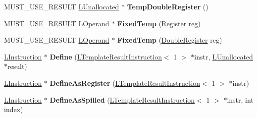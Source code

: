 \begin{DoxyCompactItemize}
\item 
M\+U\+S\+T\+\_\+\+U\+S\+E\+\_\+\+R\+E\+S\+U\+LT \hyperlink{classv8_1_1internal_1_1_l_unallocated}{L\+Unallocated} $\ast$ {\bfseries Temp\+Double\+Register} ()\hypertarget{classv8_1_1internal_1_1_l_chunk_builder_a34a748e14f232421985ee36f9491a782}{}\label{classv8_1_1internal_1_1_l_chunk_builder_a34a748e14f232421985ee36f9491a782}

\item 
M\+U\+S\+T\+\_\+\+U\+S\+E\+\_\+\+R\+E\+S\+U\+LT \hyperlink{classv8_1_1internal_1_1_l_operand}{L\+Operand} $\ast$ {\bfseries Fixed\+Temp} (\hyperlink{structv8_1_1internal_1_1_register}{Register} reg)\hypertarget{classv8_1_1internal_1_1_l_chunk_builder_ac535905a78945cd934d3c4caef86cd6d}{}\label{classv8_1_1internal_1_1_l_chunk_builder_ac535905a78945cd934d3c4caef86cd6d}

\item 
M\+U\+S\+T\+\_\+\+U\+S\+E\+\_\+\+R\+E\+S\+U\+LT \hyperlink{classv8_1_1internal_1_1_l_operand}{L\+Operand} $\ast$ {\bfseries Fixed\+Temp} (\hyperlink{structv8_1_1internal_1_1_double_register}{Double\+Register} reg)\hypertarget{classv8_1_1internal_1_1_l_chunk_builder_a751ff42cbfde3ba50b2a97831d47f23c}{}\label{classv8_1_1internal_1_1_l_chunk_builder_a751ff42cbfde3ba50b2a97831d47f23c}

\item 
\hyperlink{classv8_1_1internal_1_1_l_instruction}{L\+Instruction} $\ast$ {\bfseries Define} (\hyperlink{classv8_1_1internal_1_1_l_template_result_instruction}{L\+Template\+Result\+Instruction}$<$ 1 $>$ $\ast$instr, \hyperlink{classv8_1_1internal_1_1_l_unallocated}{L\+Unallocated} $\ast$result)\hypertarget{classv8_1_1internal_1_1_l_chunk_builder_a9314539a90068f19447b684bc4991128}{}\label{classv8_1_1internal_1_1_l_chunk_builder_a9314539a90068f19447b684bc4991128}

\item 
\hyperlink{classv8_1_1internal_1_1_l_instruction}{L\+Instruction} $\ast$ {\bfseries Define\+As\+Register} (\hyperlink{classv8_1_1internal_1_1_l_template_result_instruction}{L\+Template\+Result\+Instruction}$<$ 1 $>$ $\ast$instr)\hypertarget{classv8_1_1internal_1_1_l_chunk_builder_a4d73a076c87adad2cd6b6ac618c82d15}{}\label{classv8_1_1internal_1_1_l_chunk_builder_a4d73a076c87adad2cd6b6ac618c82d15}

\item 
\hyperlink{classv8_1_1internal_1_1_l_instruction}{L\+Instruction} $\ast$ {\bfseries Define\+As\+Spilled} (\hyperlink{classv8_1_1internal_1_1_l_template_result_instruction}{L\+Template\+Result\+Instruction}$<$ 1 $>$ $\ast$instr, int index)\hypertarget{classv8_1_1internal_1_1_l_chunk_builder_a1fd9cf7534e3b92cb10675e3b8c3dcec}{}\label{classv8_1_1internal_1_1_l_chunk_builder_a1fd9cf7534e3b92cb10675e3b8c3dcec}


\end{DoxyCompactItemize}
